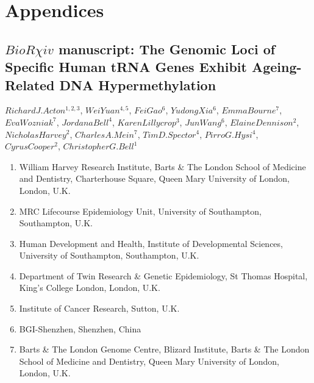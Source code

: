 \documentclass[
]{book}
\providecommand{\tightlist}{%
  \setlength{\itemsep}{0pt}\setlength{\parskip}{0pt}}
\begin{document}
\hypertarget{appendices}{%
\chapter*{Appendices}\label{appendices}}

\hypertarget{biorchi-iv-manuscript-the-genomic-loci-of-specific-human-trna-genes-exhibit-ageing-related-dna-hypermethylation}{%
\section{\texorpdfstring{\(BioR\chi iv\) manuscript: The Genomic Loci of Specific Human tRNA Genes Exhibit Ageing-Related DNA Hypermethylation}{BioR\textbackslash chi iv manuscript: The Genomic Loci of Specific Human tRNA Genes Exhibit Ageing-Related DNA Hypermethylation}}\label{biorchi-iv-manuscript-the-genomic-loci-of-specific-human-trna-genes-exhibit-ageing-related-dna-hypermethylation}}

\(Richard J. Acton ^{1,2,3}\), \(Wei Yuan ^{4,5}\), \(Fei Gao ^{6}\), \(Yudong Xia ^{6}\), \(Emma Bourne ^{7}\), \(Eva Wozniak ^{7}\), \(Jordana Bell ^{4}\), \(Karen Lillycrop ^{3}\), \(Jun Wang ^{6}\), \(Elaine Dennison ^{2}\), \(Nicholas Harvey ^{2}\), \(Charles A. Mein ^{7}\), \(Tim D. Spector ^{4}\), \(Pirro G. Hysi ^{4}\), \(Cyrus Cooper ^{2}\), \(Christopher G. Bell ^{1}\)

\begin{enumerate}
\def\labelenumi{\arabic{enumi}.}
\tightlist
\item
  William Harvey Research Institute, Barts \& The London School of Medicine and Dentistry, Charterhouse Square, Queen Mary University of London, London, U.K.
\item
  MRC Lifecourse Epidemiology Unit, University of Southampton, Southampton, U.K.
\item
  Human Development and Health, Institute of Developmental Sciences, University of Southampton, Southampton, U.K.\\
\item
  Department of Twin Research \& Genetic Epidemiology, St Thomas Hospital, King's College London, London, U.K.
\item
  Institute of Cancer Research, Sutton, U.K.
\item
  BGI-Shenzhen, Shenzhen, China
\item
  Barts \& The London Genome Centre, Blizard Institute, Barts \& The London School of Medicine and Dentistry, Queen Mary University of London, London, U.K.
\end{enumerate}
\end{document}
